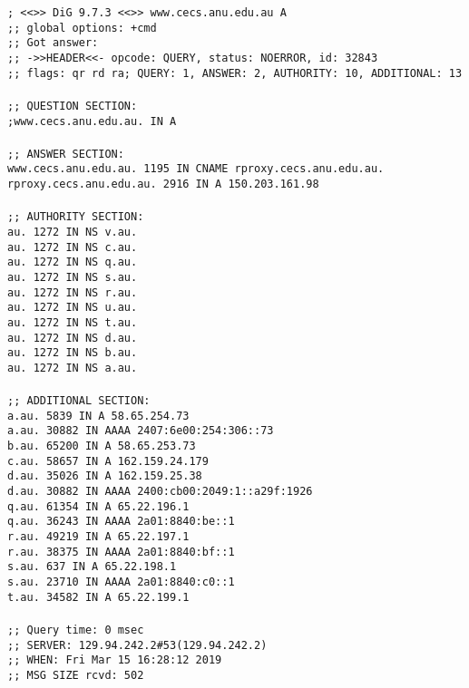 \documentclass[a4paper,11pt]{article}
\newcommand{\code}{\texttt}
\begin{document}
\begin{enumerate}[leftmargin=*]
	\code{; <<>> DiG 9.7.3 <<>> www.cecs.anu.edu.au A\\
	;; global options: +cmd\\
	;; Got answer:\\
	;; ->>HEADER<<- opcode: QUERY, status: NOERROR, id: 32843\\
	;; flags: qr rd ra; QUERY: 1, ANSWER: 2, AUTHORITY: 10, ADDITIONAL: 13\\
	\\
	;; QUESTION SECTION:\\
	;www.cecs.anu.edu.au.		IN	A\\
	\\
	;; ANSWER SECTION:\\
	www.cecs.anu.edu.au.	1195	IN	CNAME	rproxy.cecs.anu.edu.au.\\
	rproxy.cecs.anu.edu.au.	2916	IN	A	150.203.161.98\\
	\\
	;; AUTHORITY SECTION:\\
	au.			1272	IN	NS	v.au.\\
	au.			1272	IN	NS	c.au.\\
	au.			1272	IN	NS	q.au.\\
	au.			1272	IN	NS	s.au.\\
	au.			1272	IN	NS	r.au.\\
	au.			1272	IN	NS	u.au.\\
	au.			1272	IN	NS	t.au.\\
	au.			1272	IN	NS	d.au.\\
	au.			1272	IN	NS	b.au.\\
	au.			1272	IN	NS	a.au.\\
	\\
	;; ADDITIONAL SECTION:\\
	a.au.			5839	IN	A	58.65.254.73\\
	a.au.			30882	IN	AAAA	2407:6e00:254:306::73\\
	b.au.			65200	IN	A	58.65.253.73\\
	c.au.			58657	IN	A	162.159.24.179\\
	d.au.			35026	IN	A	162.159.25.38\\
	d.au.			30882	IN	AAAA	2400:cb00:2049:1::a29f:1926\\
	q.au.			61354	IN	A	65.22.196.1\\
	q.au.			36243	IN	AAAA	2a01:8840:be::1\\
	r.au.			49219	IN	A	65.22.197.1\\
	r.au.			38375	IN	AAAA	2a01:8840:bf::1\\
	s.au.			637	IN	A	65.22.198.1\\
	s.au.			23710	IN	AAAA	2a01:8840:c0::1\\
	t.au.			34582	IN	A	65.22.199.1\\
	\\
	;; Query time: 0 msec\\
	;; SERVER: 129.94.242.2\#53(129.94.242.2)\\
	;; WHEN: Fri Mar 15 16:28:12 2019\\
	;; MSG SIZE  rcvd: 502\\}


\end{enumerate}
\end{document}
